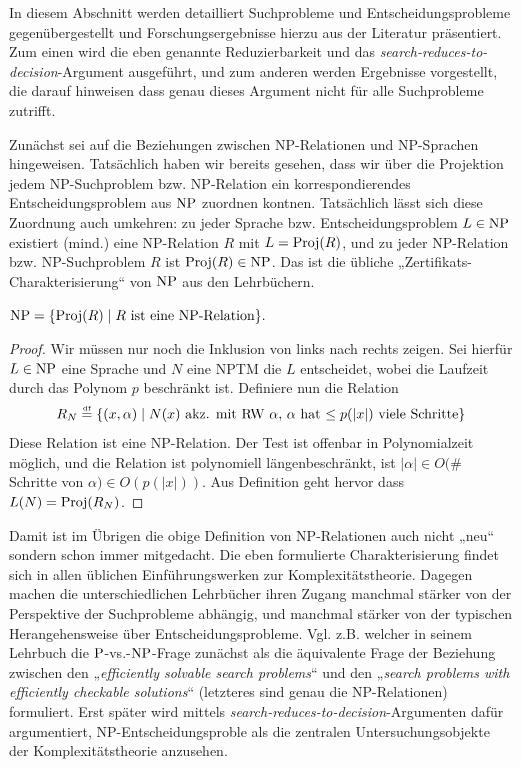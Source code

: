 In diesem Abschnitt werden detailliert Suchprobleme und Entscheidungsprobleme gegenübergestellt und Forschungsergebnisse hierzu aus der Literatur präsentiert.
Zum einen wird die eben genannte Reduzierbarkeit und das \emph{search-reduces-to-decision}-Argument ausgeführt, und zum anderen werden Ergebnisse vorgestellt, die darauf hinweisen dass genau dieses Argument nicht für alle Suchprobleme zutrifft.

Zunächst sei auf die Beziehungen zwischen NP-Relationen und NP-Sprachen hingeweisen.
Tatsächlich haben wir bereits gesehen, dass wir über die Projektion jedem NP-Suchproblem bzw. NP-Relation ein korrespondierendes Entscheidungsproblem aus $\NP$ zuordnen kontnen. Tatsächlich lässt sich diese Zuordnung auch umkehren: zu jeder Sprache bzw. Entscheidungsproblem $L\in \NP$ existiert (mind.) eine NP-Relation $R$ mit $L=\Proj(R)$, und zu jeder NP-Relation bzw. NP-Suchproblem $R$ ist $\Proj(R)\in\NP$. Das ist die übliche „Zertifikats-Charakterisierung“ von $\NP$ aus den Lehrbüchern.
\begin{observation}\label{obs:np-certificate-def}
    $\NP = \{ \Proj(R) \mid \text{$R$ ist eine NP-Relation} \}.$
\end{observation}
\begin{proof}
    Wir müssen nur noch die Inklusion von links nach rechts zeigen. Sei hierfür $L\in\NP$ eine Sprache und $N$ eine NPTM die $L$ entscheidet, wobei die Laufzeit durch das Polynom $p$ beschränkt ist. Definiere nun die Relation
    \[ R_N  \defeq \{ (x, \alpha) \mid \text{$N(x)$ akz. mit RW $\alpha$, $\alpha$ hat $\leq p(|x|)$ viele Schritte} \} \]
    Diese Relation ist eine NP-Relation. Der Test ist offenbar in Polynomialzeit möglich, und die Relation ist polynomiell längenbeschränkt, ist $|\alpha|\in O($\# Schritte von $\alpha)\in O(p(|x|))$.
    Aus Definition geht hervor dass $L(N) = \Proj(R_N)$.
\end{proof}
Damit ist im Übrigen die obige Definition von NP-Relationen auch nicht „neu“ sondern schon immer mitgedacht. Die eben formulierte Charakterisierung findet sich in allen üblichen Einführungswerken zur Komplexitätstheorie. Dagegen machen die unterschiedlichen Lehrbücher ihren Zugang manchmal stärker von der Perspektive der Suchprobleme abhängig, und manchmal stärker von der typischen Herangehensweise über Entscheidungsprobleme.
Vgl. z.B. \textcite{goldreich_computational_2008} welcher in seinem Lehrbuch die $\P$-vs.-$\NP$-Frage zunächst als die äquivalente Frage der Beziehung zwischen den „\emph{efficiently solvable search problems}“ und den „\emph{search problems with efficiently checkable solutions}“ (letzteres sind genau die NP-Relationen) formuliert. Erst später wird mittels \emph{search-reduces-to-decision}-Argumenten dafür argumentiert, NP-Entscheidungsproble als die zentralen Untersuchungsobjekte der Komplexitätstheorie anzusehen.

